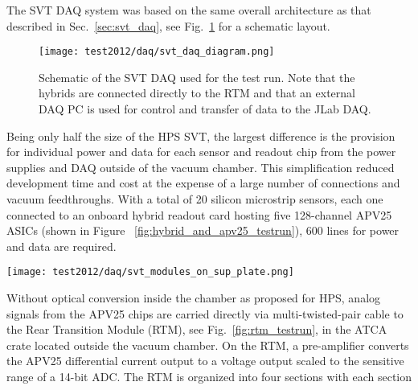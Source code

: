 
The SVT DAQ system was based on the same overall architecture as that 
described in Sec.~\ref{sec:svt_daq}, see Fig.~\ref{fig:svtdaq} for a schematic layout. 
 \begin{figure}[t]
\texttt{[image: test2012/daq/svt\_daq\_diagram.png]}
\caption{\small{Schematic of the SVT DAQ used for the test run. Note that the hybrids are connected directly 
to the RTM and that an external DAQ PC is used for control and transfer of data to the JLab DAQ.}}
\label{fig:svtdaq}
\end{figure}
Being only half the size of the HPS SVT, the largest difference is the provision for
individual power and data for each sensor and readout chip from the power supplies and DAQ outside of the vacuum chamber.
This simplification reduced development time and cost at the expense of a large number of connections and vacuum feedthroughs.
With a total of 20 silicon microstrip sensors, each one connected to an onboard hybrid readout 
card hosting five 128-channel APV25 ASICs (shown in Figure ~\ref{fig:hybrid_and_apv25_testrun}), 600 lines for power and data are required.
 \begin{figure*}[t]
\texttt{[image: test2012/daq/svt\_modules\_on\_sup\_plate.png]}
\caption{\small{View from upstream of one half of the SVT modules mounted on the support plate. Signal, 
power and control are soldered, and potted, to pads at one end while the five APV25 chips are wirebonded 
to the silicon sensor at the other.}}
\label{fig:hybrid_and_apv25_testrun}
\end{figure*}
Without optical conversion inside the chamber as proposed for HPS, analog signals from the APV25 chips are 
carried directly via multi-twisted-pair cable to the Rear Transition Module (RTM), see Fig.~\ref{fig:rtm_testrun}, in the ATCA crate located outside the vacuum chamber. 
On the RTM, a pre-amplifier converts the APV25 differential current output to a voltage output 
scaled to the sensitive range of a 14-bit ADC. The RTM is organized into four sections with each section 
